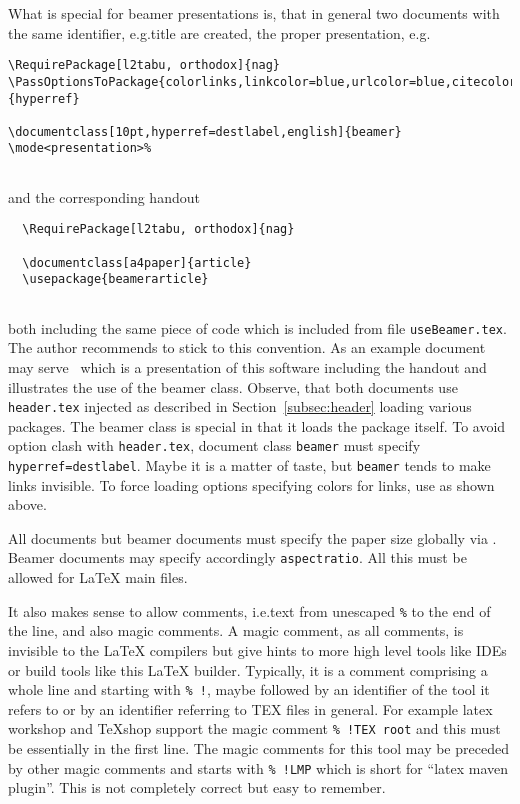 What is special for beamer presentations is, 
that in general two documents with the same identifier, e.g.\@ title are created, 
the proper presentation, e.g.\@ 
\begin{Verbatim}[fontsize=\scriptsize]
\RequirePackage[l2tabu, orthodox]{nag}
\PassOptionsToPackage{colorlinks,linkcolor=blue,urlcolor=blue,citecolor=blue}{hyperref}

\documentclass[10pt,hyperref=destlabel,english]{beamer}
\mode<presentation>%


\end{Verbatim}
%
and the corresponding handout 
%
\begin{Verbatim}
  \RequirePackage[l2tabu, orthodox]{nag}

  \documentclass[a4paper]{article}
  \usepackage{beamerarticle}
  
\end{Verbatim}
%
both including the same piece of code which is included from file \texttt{useBeamer.tex}. 
The author recommends to stick to this convention. 
As an example document may serve~\cite{PresBeamer} 
which is a presentation of this software including the handout 
and illustrates the use of the beamer class. 
Observe, that both documents use \texttt{header.tex} injected 
as described in Section~\ref{subsec:header} loading various packages. 
The beamer class is special in that it loads the  package itself. 
To avoid option clash with \texttt{header.tex}, 
document class \texttt{beamer} must specify \texttt{hyperref=destlabel}. 
Maybe it is a matter of taste, but \texttt{beamer} tends to make links invisible. 
To force loading options specifying colors for links, 
use  as shown above. 

All documents but beamer documents 
must specify the paper size globally via . 
Beamer documents may specify accordingly \texttt{aspectratio}. 
All this must be allowed for \LaTeX{} main files. 


It also makes sense to allow comments, 
i.e.\@ text from unescaped \texttt{\%} to the end of the line, 
and also magic comments. 
A magic comment, as all comments, is invisible to the \LaTeX{} compilers 
but give hints to more high level tools 
like IDEs or build tools like this \LaTeX{} builder. 
Typically, it is a comment comprising a whole line and starting with \texttt{\%~!}, 
maybe followed by an identifier of the tool it refers to 
or by an identifier referring to TEX files in general. 
For example latex workshop and \TeX{}shop support the magic comment \texttt{\%~!TEX root} 
and this must be essentially in the first line. 
The magic comments for this tool may be preceded by other magic comments 
and starts with \texttt{\%~!LMP} which is short for ``latex maven plugin''. 
This is not completely correct but easy to remember. 


